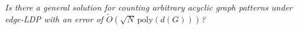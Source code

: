 











\emph{{Is there a general solution for counting arbitrary acyclic graph patterns under edge-LDP with an error of $\tilde{O}(\sqrt{N}\,\mathrm{poly}(d(G)))$?}}




